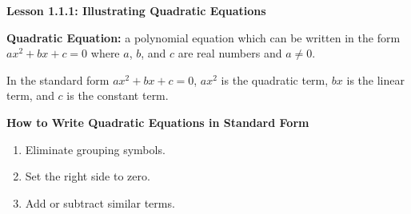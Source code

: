 
\begin{center}
\textbf{Lesson 1.1.1: Illustrating Quadratic Equations}
\end{center}

\vspace*{-1.2ex}

\noindent\textbf{Quadratic Equation:} a polynomial equation which can be written in the form $ ax^2 + bx + c = 0 $ where $a$, $b$, and $c$ are real numbers and $ a \neq 0 $. 

In the standard form $ ax^2 + bx + c = 0 $, $ ax^2 $ is the quadratic term, $ bx $ is the linear term, and $ c $ is the constant term.

\textbf{How to Write Quadratic Equations in Standard Form}
\begin{enumerate}[label = \color{blue}\arabic*. ]
   \item Eliminate grouping symbols.
   \item Set the right side to zero.
   \item Add or subtract similar terms.
\end{enumerate}
	 
